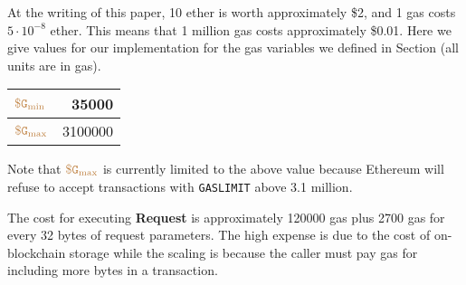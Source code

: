 At the writing of this paper, 10 ether is worth approximately \$2, and 1 gas costs $5 \cdot 10^{-8}$ ether.
This means that 1 million gas costs approximately \$0.01.
Here we give values for our implementation for the gas variables we defined in Section  (all units are in gas).
\begin{center}
  \begin{tabular}{lr}
    \hline
    $\tt {\color{brown} \$G_\text{min} }$ & \num[group-separator={,}]{35000} \\
    \hline
    $\tt {\color{brown} \$G_\text{max} }$ & \num[group-separator={,}]{3100000} \\
    \hline
  \end{tabular}
\end{center}
Note that $\tt {\color{brown} \$G_\text{max} }$ is currently limited to the above value because Ethereum will refuse to accept transactions with {\tt GASLIMIT} above 3.1 million.


The cost for executing {\bf Request} is approximately \num[group-separator={,}]{120000} gas plus \num[group-separator={,}]{2700} gas for every 32 bytes of request parameters.
The high expense is due to the cost of on-blockchain storage
while the scaling is because the caller must pay gas for including more bytes in a transaction.


